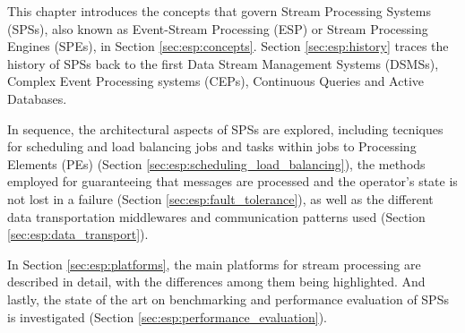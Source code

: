 \documentclass[ppgc,diss,english]{iiufrgs}
\begin{document}
%
%

%


This chapter introduces the concepts that govern Stream Processing Systems (SPSs), also known as Event-Stream Processing (ESP) or Stream Processing Engines (SPEs), in Section \ref{sec:esp:concepts}. Section \ref{sec:esp:history} traces the history of SPSs back to the first Data Stream Management Systems (DSMSs), Complex Event Processing systems (CEPs), Continuous Queries and Active Databases.

In sequence, the architectural aspects of SPSs are explored, including tecniques for scheduling and load balancing jobs and tasks within jobs to Processing Elements (PEs) (Section \ref{sec:esp:scheduling_load_balancing}), the methods employed for guaranteeing that messages are processed and the operator's state is not lost in a failure (Section \ref{sec:esp:fault_tolerance}), as well as the different data transportation middlewares and communication patterns used (Section \ref{sec:esp:data_transport}).

In Section \ref{sec:esp:platforms}, the main platforms for stream processing are described in detail, with the differences among them being highlighted. And lastly, the state of the art on benchmarking and performance evaluation of SPSs is investigated (Section \ref{sec:esp:performance_evaluation}).
\end{document}
